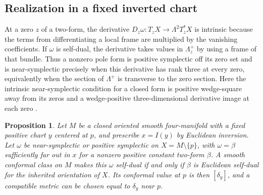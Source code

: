 \documentclass[11pt,letterpaper]{article}
\numberwithin{equation}{section}
\newtheorem{proposition}{Proposition}[section]
\begin{document}
\subsection{Realization in a fixed inverted chart}

At a zero \(z\) of a two-form, the derivative
\(D_z\omega\colon T_zX\to\Lambda^2T_z^*X\) is intrinsic because the
terms from differentiating a local frame are multiplied by the vanishing
coefficients. If \(\omega\) is self-dual, the derivative takes values
in \(\Lambda_z^+\) by using a frame of that bundle. Thus a nonzero pole
form is positive symplectic off its zero set and is near-symplectic
precisely when this derivative has rank three at every zero, equivalently
when the section of \(\Lambda^+\) is transverse to the zero section.
Here the intrinsic near-symplectic condition for a closed form is
positive wedge-square away from its zeros and a wedge-positive
three-dimensional derivative image at each zero
\cite[Definition~1.1.1 and Proposition~1.1.4]{Perutz2005SurfaceFibrations}.

\begin{proposition}\label{prop:pole-marked-realization}
Let \(M\) be a closed oriented smooth four-manifold with a fixed
positive chart \(y\) centered at \(p\), and prescribe \(x=I(y)\) by
Euclidean inversion. Let \(\omega\) be near-symplectic or positive
symplectic on \(X=M\setminus\{p\}\), with \(\omega=\beta\)
sufficiently far out in \(x\) for a nonzero positive constant
two-form \(\beta\). A smooth conformal class on \(M\) makes this
\(\omega\) self-dual if and only if \(\beta\) is Euclidean self-dual
for the inherited orientation of \(X\). Its conformal value at
\(p\) is then \([\delta_y]\), and a compatible metric can be chosen
equal to \(\delta_y\) near \(p\).
\end{proposition}
\end{document}
